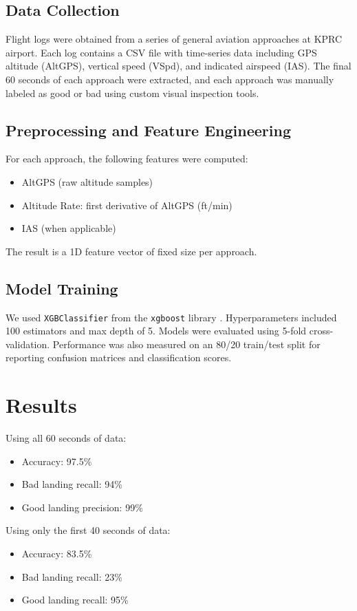 \documentclass[conference]{IEEEtran}
\begin{document}
\subsection{Data Collection}
Flight logs were obtained from a series of general aviation approaches at KPRC airport. Each log contains a CSV file with time-series data including GPS altitude (AltGPS), vertical speed (VSpd), and indicated airspeed (IAS). The final 60 seconds of each approach were extracted, and each approach was manually labeled as good or bad using custom visual inspection tools.

\subsection{Preprocessing and Feature Engineering}
For each approach, the following features were computed:
\begin{itemize}
    \item AltGPS (raw altitude samples)
    \item Altitude Rate: first derivative of AltGPS (ft/min)
    \item IAS (when applicable)
\end{itemize}
The result is a 1D feature vector of fixed size per approach.

\subsection{Model Training}
We used \texttt{XGBClassifier} from the \texttt{xgboost} library \cite{chen2016xgboost}. Hyperparameters included 100 estimators and max depth of 5. Models were evaluated using 5-fold cross-validation. Performance was also measured on an 80/20 train/test split for reporting confusion matrices and classification scores.

\section{Results}

Using all 60 seconds of data:
\begin{itemize}
    \item Accuracy: 97.5\%
    \item Bad landing recall: 94\%
    \item Good landing precision: 99\%
\end{itemize}

Using only the first 40 seconds of data:
\begin{itemize}
    \item Accuracy: 83.5\%
    \item Bad landing recall: 23\%
    \item Good landing recall: 95\%
\end{itemize}
\end{document}
